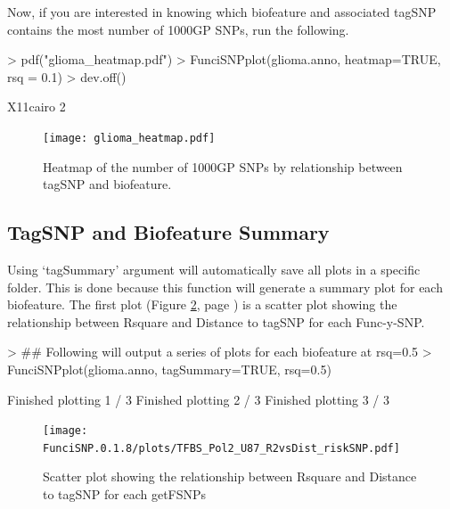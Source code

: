 \documentclass[12pt,fullpage]{article}
\begin{document}
Now, if you are interested in knowing which biofeature and associated tagSNP
contains the most number of 1000GP SNPs, run the following.

\begin{Schunk}
\begin{Sinput}
> pdf("glioma_heatmap.pdf")
> FunciSNPplot(glioma.anno, heatmap=TRUE, rsq = 0.1)
> dev.off()
\end{Sinput}
\begin{Soutput}
X11cairo 
       2 
\end{Soutput}
\end{Schunk}

\begin{figure}[ht!]
\begin{center}
\texttt{[image: glioma\_heatmap.pdf]}
\caption{\label{fig:glioma_heatmap.pdf} Heatmap of the number of 1000GP SNPs by
    relationship between tagSNP and biofeature.}
{\footnotesize{}}
\end{center}
\end{figure}

\subsection{TagSNP and Biofeature Summary}

Using `tagSummary' argument will automatically save all plots in a specific
folder. This is done because this function will generate a summary plot for each
biofeature. The first plot (Figure \ref{fig:TFBS_Pol2_U87_R2vsDist_riskSNP.pdf},
        page \pageref{fig:TFBS_Pol2_U87_R2vsDist_riskSNP.pdf}) is a scatter plot
showing the relationship between Rsquare and Distance to tagSNP for each
Func-y-SNP.

\begin{Schunk}
\begin{Sinput}
> ## Following will output a series of plots for each biofeature at rsq=0.5
> FunciSNPplot(glioma.anno, tagSummary=TRUE, rsq=0.5)
\end{Sinput}
\begin{Soutput}
Finished plotting  1 / 3 
Finished plotting  2 / 3 
Finished plotting  3 / 3 
\end{Soutput}
\end{Schunk}

\begin{figure}[ht!]
\begin{center}
\texttt{[image: FunciSNP.0.1.8/plots/TFBS\_Pol2\_U87\_R2vsDist\_riskSNP.pdf]}
\caption{\label{fig:TFBS_Pol2_U87_R2vsDist_riskSNP.pdf} Scatter plot 
showing the relationship between Rsquare and Distance to tagSNP for each 
getFSNPs}
{\footnotesize{}}
\end{center}
\end{figure}
\end{document}
